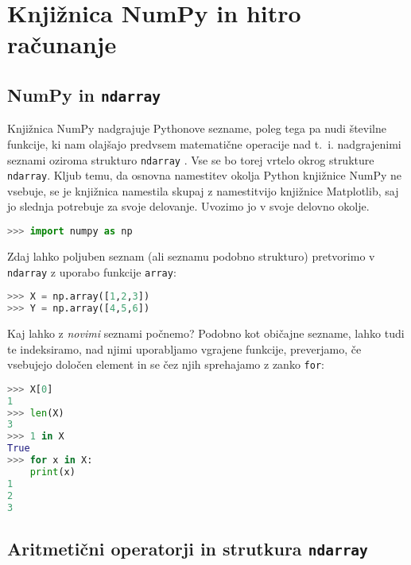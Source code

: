 \chapter{Knjižnica NumPy in hitro računanje}

\section{NumPy in \texttt{ndarray}}

Knjižnica NumPy nadgrajuje Pythonove sezname, poleg tega pa nudi številne funkcije, ki nam olajšajo predvsem matematične operacije nad t.~i. nadgrajenimi seznami oziroma strukturo \texttt{ndarray} . Vse se bo torej vrtelo okrog strukture \texttt{ndarray}. Kljub temu, da osnovna namestitev okolja Python knjižnice NumPy ne vsebuje, se je knjižnica namestila skupaj z namestitvijo knjižnice Matplotlib, saj jo slednja potrebuje za svoje delovanje. Uvozimo jo v svoje delovno okolje.
\begin{lstlisting}[language=Python]
>>> import numpy as np
\end{lstlisting}
Zdaj lahko poljuben seznam (ali seznamu podobno strukturo) pretvorimo v \texttt{ndarray} z uporabo funkcije \texttt{array}:
\begin{lstlisting}[language=Python]
>>> X = np.array([1,2,3])
>>> Y = np.array([4,5,6])
\end{lstlisting}
Kaj lahko z \emph{novimi} seznami počnemo? Podobno kot običajne sezname, lahko tudi te indeksiramo, nad njimi uporabljamo vgrajene funkcije, preverjamo, če vsebujejo določen element in se čez njih sprehajamo z zanko \texttt{for}:
\begin{lstlisting}[language=Python]
>>> X[0]
1
>>> len(X)
3
>>> 1 in X
True
>>> for x in X:
	print(x)
1
2
3
\end{lstlisting}

\section{Aritmetični operatorji in strutkura \texttt{ndarray}}

